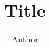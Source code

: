 \documentclass{article}
\begin{document}
\title{Title}
\author{Author}
\maketitle
\begin{abstract}
\end{abstract}
\end{document}
